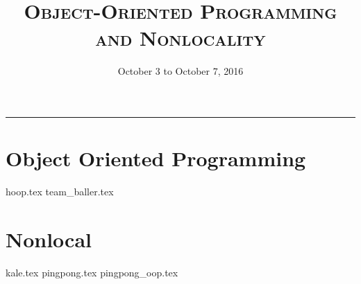 \documentclass{exam}
\title{\textsc{Object-Oriented Programming and Nonlocality}}
\date{October 3 to October 7, 2016}
\begin{document}
\maketitle
\rule{\textwidth}{0.15em}
\fontsize{12}{15}\selectfont


\section{Object Oriented Programming}
\begin{questions}
    {hoop.tex}
    {team_baller.tex}
\end{questions}

\newpage
\section{Nonlocal}
\begin{questions}
    {kale.tex}
    \newpage
    {pingpong.tex}
    {pingpong_oop.tex}
\end{questions}

\end{document}
